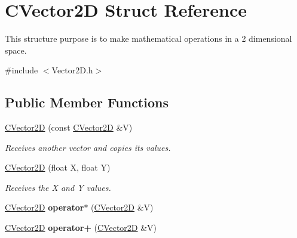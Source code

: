\hypertarget{struct_c_vector2_d}{}\section{C\+Vector2D Struct Reference}
\label{struct_c_vector2_d}


This structure purpose is to make mathematical operations in a 2 dimensional space.  




{\ttfamily \#include $<$Vector2\+D.\+h$>$}

\subsection*{Public Member Functions}
\begin{DoxyCompactItemize}
\item 
\hyperlink{struct_c_vector2_d_ae4902345e98b957787770446d92d5b1e}{C\+Vector2D} (const \hyperlink{struct_c_vector2_d}{C\+Vector2D} \&V)\hypertarget{struct_c_vector2_d_ae4902345e98b957787770446d92d5b1e}{}\label{struct_c_vector2_d_ae4902345e98b957787770446d92d5b1e}

\begin{DoxyCompactList}\small\item\em Receives another vector and copies its values. \end{DoxyCompactList}\item 
\hyperlink{struct_c_vector2_d_ad8bf935c08765be5d7957050e10cdc5a}{C\+Vector2D} (float X, float Y)\hypertarget{struct_c_vector2_d_ad8bf935c08765be5d7957050e10cdc5a}{}\label{struct_c_vector2_d_ad8bf935c08765be5d7957050e10cdc5a}

\begin{DoxyCompactList}\small\item\em Receives the X and Y values. \end{DoxyCompactList}\item 
\hyperlink{struct_c_vector2_d}{C\+Vector2D} {\bfseries operator$\ast$} (\hyperlink{struct_c_vector2_d}{C\+Vector2D} \&V)\hypertarget{struct_c_vector2_d_aabb635831cdb5caad9e418a307e77b13}{}\label{struct_c_vector2_d_aabb635831cdb5caad9e418a307e77b13}

\item 
\hyperlink{struct_c_vector2_d}{C\+Vector2D} {\bfseries operator+} (\hyperlink{struct_c_vector2_d}{C\+Vector2D} \&V)\hypertarget{struct_c_vector2_d_a1dabea9e93a890bbfec0c079d7de5019}{}\label{struct_c_vector2_d_a1dabea9e93a890bbfec0c079d7de5019}


\end{DoxyCompactItemize}
